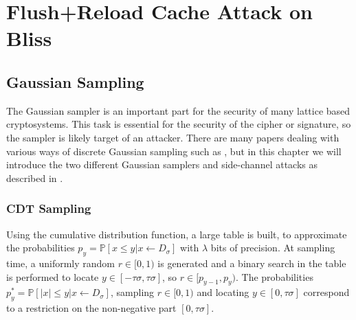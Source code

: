 \chapter{Flush+Reload Cache Attack on Bliss}
\label{bliss}

\section{Gaussian Sampling}
The Gaussian sampler is an important part for the security of many lattice based cryptosystems. This task is essential for the security of the cipher or signature, so the sampler is likely target of an attacker. There are many papers dealing with various ways of discrete Gaussian sampling such as \cite{cryptoeprint:2010:088}, but in this chapter we will introduce the two different Gaussian samplers and side-channel attacks as described in \cite{cryptoeprint:2016:300}.
\subsection{CDT Sampling}
Using the cumulative distribution function, a large table is built, to approximate the probabilities $p_y=\mathbb{P}[x \le y| x \leftarrow D_\sigma ]$ with $\lambda$ bits of precision. At sampling time, a uniformly random $r \in [0,1)$ is generated and a binary search in the table is performed to locate $y \in [-\tau\sigma, \tau\sigma]$, so $r \in [p_{y-1}, p_y)$. The probabilities $p^*_y = \mathbb{P}[|x| \le y| x \leftarrow D_\sigma]$, sampling $r \in [0,1)$ and locating $y \in [0, \tau \sigma]$ correspond to a restriction on the non-negative part $[0, \tau\sigma]$.

